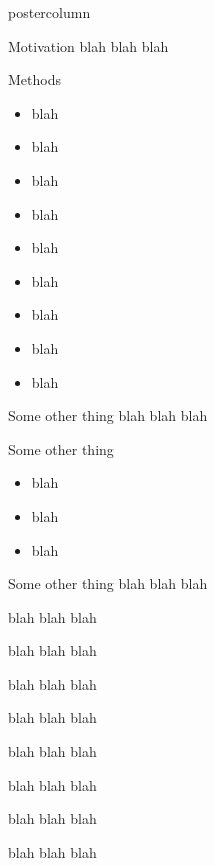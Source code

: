 \documentclass[final]{beamer}
\begin{document}
\begin{frame}
\begin{columns}
\begin{column}{.33\textwidth}
\begin{beamercolorbox}[center,wd=\textwidth]{postercolumn}
\begin{minipage}[T]{.95\textwidth}
{            \begin{block}{Motivation}
              blah blah blah
            \end{block}
            \vfill
            \begin{block}{Methods}
              \begin{itemize}
              \item blah
              \item blah
              \item blah
              \item blah
              \item blah
              \item blah
              \item blah
              \item blah
              \item blah
              \end{itemize}              
            \end{block}
            \vfill
            \begin{block}{Some other thing}
              blah blah blah
            \end{block}
            \vfill
            \begin{block}{Some other thing}
              \begin{itemize}
              \item blah
              \item blah
              \item blah
              \end{itemize}              
            \end{block}
            \vfill
            \begin{block}{Some other thing}
              blah blah blah

              blah blah blah

              blah blah blah

              blah blah blah

              blah blah blah

              blah blah blah

              blah blah blah

              blah blah blah

              blah blah blah
            \end{block}
          }
        \end{minipage}
      \end{beamercolorbox}
    \end{column}


\end{columns}
\end{frame}
\end{document}

